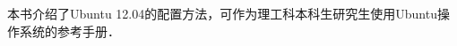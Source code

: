  \vspace*{0.0cm}
\thispagestyle{empty}
\vspace*{2.2cm}
\centerline{\hei{\color{darkblue}{内~容~简~介}}}\vspace{2cm}

本书介绍了Ubuntu 12.04的配置方法，可作为理工科本科生研究生使用Ubuntu操作系统的参考手册．
